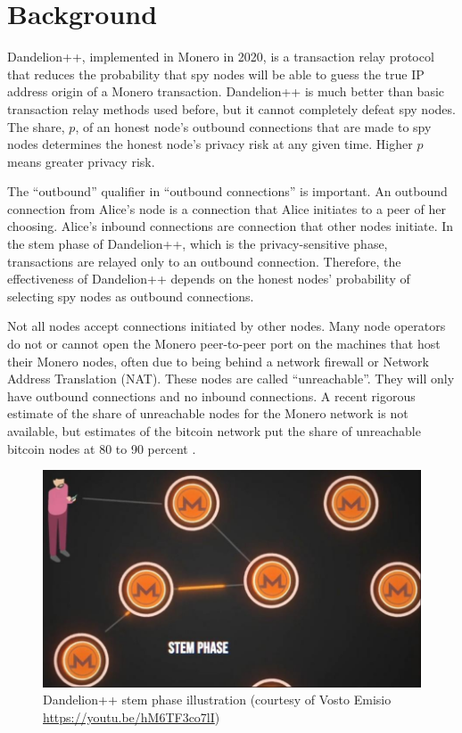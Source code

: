 \documentclass[english]{mrl}
\theoremstyle{plain}
\begin{document}
\section{Background}

Dandelion++, implemented in Monero in 2020, is a transaction relay
protocol that reduces the probability that spy nodes will be able
to guess the true IP address origin of a Monero transaction. Dandelion++
is much better than basic transaction relay methods used before, but
it cannot completely defeat spy nodes. The share, $p$, of an honest
node's outbound connections that are made to spy nodes determines
the honest node's privacy risk at any given time. Higher $p$ means
greater privacy risk.

The ``outbound'' qualifier in ``outbound connections'' is important.
An outbound connection from Alice's node is a connection that Alice
initiates to a peer of her choosing. Alice's inbound connections are
connection that other nodes initiate. In the stem phase of Dandelion++,
which is the privacy-sensitive phase, transactions are relayed only
to an outbound connection. Therefore, the effectiveness of Dandelion++
depends on the honest nodes' probability of selecting spy nodes as
outbound connections.

Not all nodes accept connections initiated by other nodes. Many node
operators do not or cannot open the Monero peer-to-peer port on the
machines that host their Monero nodes, often due to being behind a
network firewall or Network Address Translation (NAT). These nodes
are called ``unreachable''. They will only have outbound connections
and no inbound connections. A recent rigorous estimate of the share
of unreachable nodes for the Monero network is not available, but
estimates of the bitcoin network put the share of unreachable bitcoin
nodes at 80 to 90 percent \cite{grundmann2021estimatingpeerdegreereachable,Franzoni2022b}.

\begin{figure}
\begin{centering}
\caption{Dandelion++ stem phase illustration (courtesy of Vosto Emisio \protect\href{https://youtu.be/hM6TF3co7lI}{https://youtu.be/hM6TF3co7lI})}
\par\end{centering}
\centering{}\includegraphics[scale=0.5]{images/stem-phase}
\end{figure}
\end{document}
